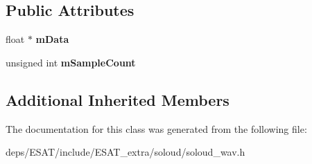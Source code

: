 \subsection*{Public Attributes}
\begin{DoxyCompactItemize}
\item 
\mbox{\label{class_so_loud_1_1_wav_a9c1c69df5dde076641f92d6553f3db38}} 
float $\ast$ {\bfseries m\+Data}
\item 
\mbox{\label{class_so_loud_1_1_wav_ac0cbf7aeb7bdcd19e2d2da58117c4ea3}} 
unsigned int {\bfseries m\+Sample\+Count}
\end{DoxyCompactItemize}
\subsection*{Additional Inherited Members}


The documentation for this class was generated from the following file\+:\begin{DoxyCompactItemize}
\item 
deps/\+E\+S\+A\+T/include/\+E\+S\+A\+T\+\_\+extra/soloud/soloud\+\_\+wav.\+h\end{DoxyCompactItemize}
